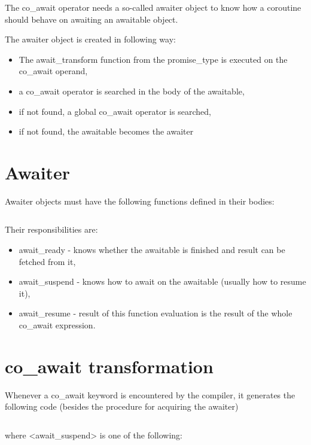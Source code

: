 \documentclass[twoside,twocolumn, 10pt]{article}
\begin{document}
	The co\_await operator needs a so-called awaiter object to know
	how a coroutine should behave on awaiting an awaitable object.

	The awaiter object is created in following way:

	\begin{itemize}
		\item The await\_transform function from the
		 promise\_type is executed on the co\_await operand,
		\item a co\_await operator is searched in the body of the awaitable,
		\item if not found, a global co\_await operator is searched,
		\item if not found, the awaitable becomes the awaiter
	\end{itemize}

  \pagebreak[0]
	\section{Awaiter}

	Awaiter objects must have the following functions defined in their bodies:

	\inputminted{c++}{code-examples/theory-custom-coroutine/awaiter.hpp}

	Their responsibilities are:
	\begin{itemize}
		\item await\_ready - knows whether the awaitable is finished and result can be fetched from it,
		\item await\_suspend - knows how to await on the awaitable (usually how to resume it),
		\item await\_resume - result of this function evaluation is the result of the whole co\_await expression.
	\end{itemize}

  \pagebreak[0]
	\section{co\_await transformation}

	Whenever a co\_await keyword is encountered by the compiler, it generates the following code (besides the procedure for acquiring the awaiter)

	\inputminted{c++}{code-examples/theory-custom-coroutine/co-await-transformation.cpp}

	where <await\_suspend> is one of the following:
\end{document}
